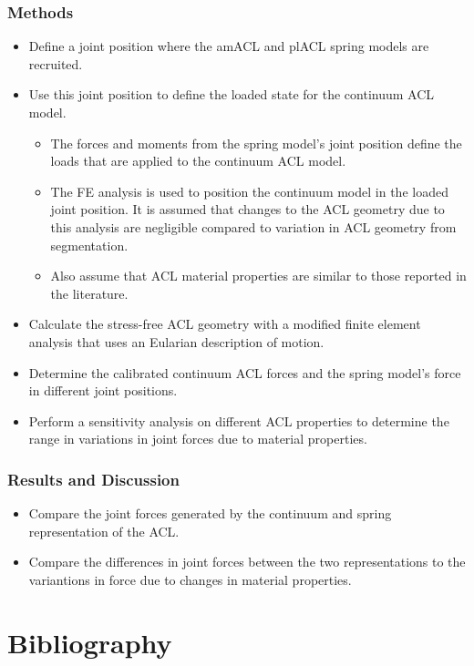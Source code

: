 \documentclass{article}
\begin{document}
\subsubsection{Methods}
\begin{itemize}
    \item Define a joint position where the amACL and plACL spring models are recruited.
    \item Use this joint position to define the loaded state for the continuum ACL model.
    \begin{itemize}
        \item The forces and moments from the spring model's joint position define the loads that are applied to the continuum ACL model.
        \item The FE analysis is used to position the continuum model in the loaded joint position. It is assumed that changes to the ACL geometry due to this analysis are negligible compared to variation in ACL geometry from segmentation.
        \item Also assume that ACL material properties are similar to those reported in the literature.
    \end{itemize}
    \item Calculate the stress-free ACL geometry with a modified finite element analysis that uses an Eularian description of motion.
    \item Determine the calibrated continuum ACL forces and the spring model's force in different joint positions.
    \item Perform a sensitivity analysis on different ACL properties to determine the range in variations in joint forces due to material properties.
\end{itemize}
\subsubsection{Results and Discussion}
\begin{itemize}
    \item Compare the joint forces generated by the continuum and spring representation of the ACL.
    \item Compare the differences in joint forces between the two representations to the variantions in force due to changes in material properties.
\end{itemize}

\section{Bibliography}

\end{document}
